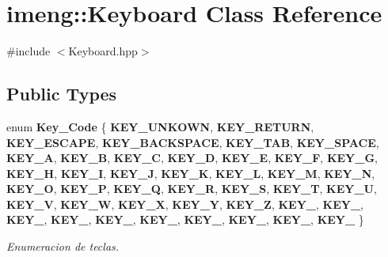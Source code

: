 \section{imeng\+::Keyboard Class Reference}
\label{classimeng_1_1_keyboard}


{\ttfamily \#include $<$Keyboard.\+hpp$>$}

\subsection*{Public Types}
\begin{DoxyCompactItemize}
\item 
enum \textbf{ Key\+\_\+\+Code} \{ \newline
\textbf{ K\+E\+Y\+\_\+\+U\+N\+K\+O\+WN}, 
\textbf{ K\+E\+Y\+\_\+\+R\+E\+T\+U\+RN}, 
\textbf{ K\+E\+Y\+\_\+\+E\+S\+C\+A\+PE}, 
\textbf{ K\+E\+Y\+\_\+\+B\+A\+C\+K\+S\+P\+A\+CE}, 
\newline
\textbf{ K\+E\+Y\+\_\+\+T\+AB}, 
\textbf{ K\+E\+Y\+\_\+\+S\+P\+A\+CE}, 
\textbf{ K\+E\+Y\+\_\+A}, 
\textbf{ K\+E\+Y\+\_\+B}, 
\newline
\textbf{ K\+E\+Y\+\_\+C}, 
\textbf{ K\+E\+Y\+\_\+D}, 
\textbf{ K\+E\+Y\+\_\+E}, 
\textbf{ K\+E\+Y\+\_\+F}, 
\newline
\textbf{ K\+E\+Y\+\_\+G}, 
\textbf{ K\+E\+Y\+\_\+H}, 
\textbf{ K\+E\+Y\+\_\+I}, 
\textbf{ K\+E\+Y\+\_\+J}, 
\newline
\textbf{ K\+E\+Y\+\_\+K}, 
\textbf{ K\+E\+Y\+\_\+L}, 
\textbf{ K\+E\+Y\+\_\+M}, 
\textbf{ K\+E\+Y\+\_\+N}, 
\newline
\textbf{ K\+E\+Y\+\_\+O}, 
\textbf{ K\+E\+Y\+\_\+P}, 
\textbf{ K\+E\+Y\+\_\+Q}, 
\textbf{ K\+E\+Y\+\_\+R}, 
\newline
\textbf{ K\+E\+Y\+\_\+S}, 
\textbf{ K\+E\+Y\+\_\+T}, 
\textbf{ K\+E\+Y\+\_\+U}, 
\textbf{ K\+E\+Y\+\_\+V}, 
\newline
\textbf{ K\+E\+Y\+\_\+W}, 
\textbf{ K\+E\+Y\+\_\+X}, 
\textbf{ K\+E\+Y\+\_\+Y}, 
\textbf{ K\+E\+Y\+\_\+Z}, 
\newline
\textbf{ K\+E\+Y\+\_}, 
\textbf{ K\+E\+Y\+\_}, 
\textbf{ K\+E\+Y\+\_}, 
\textbf{ K\+E\+Y\+\_}, 
\newline
\textbf{ K\+E\+Y\+\_}, 
\textbf{ K\+E\+Y\+\_}, 
\textbf{ K\+E\+Y\+\_}, 
\textbf{ K\+E\+Y\+\_}, 
\newline
\textbf{ K\+E\+Y\+\_}, 
\textbf{ K\+E\+Y\+\_}
 \}
\begin{DoxyCompactList}\small\item\em Enumeracion de teclas. \end{DoxyCompactList}\end{DoxyCompactItemize}
